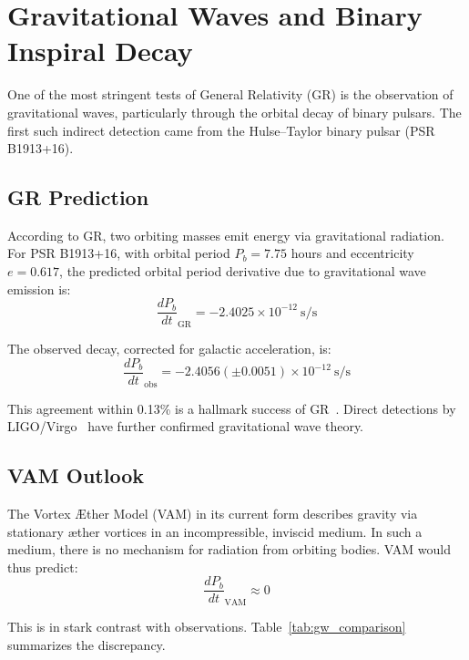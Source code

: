 \section{Gravitational Waves and Binary Inspiral Decay}

One of the most stringent tests of General Relativity (GR) is the observation of gravitational waves, particularly through the orbital decay of binary pulsars. The first such indirect detection came from the Hulse--Taylor binary pulsar (PSR B1913+16).

\subsection*{GR Prediction}

According to GR, two orbiting masses emit energy via gravitational radiation. For PSR B1913+16, with orbital period $P_b = 7.75$ hours and eccentricity $e = 0.617$, the predicted orbital period derivative due to gravitational wave emission is:
\begin{equation}
    \frac{dP_b}{dt}_\text{GR} = -2.4025\times10^{-12} \ \text{s/s}
\end{equation}

The observed decay, corrected for galactic acceleration, is:
\begin{equation}
    \frac{dP_b}{dt}_\text{obs} = -2.4056(\pm 0.0051)\times10^{-12} \ \text{s/s}
\end{equation}

This agreement within 0.13\% is a hallmark success of GR~\cite{weisberg2016}. Direct detections by LIGO/Virgo~\cite{abbott2016} have further confirmed gravitational wave theory.

\subsection*{VAM Outlook}

The Vortex Æther Model (VAM) in its current form describes gravity via stationary æther vortices in an incompressible, inviscid medium. In such a medium, there is no mechanism for radiation from orbiting bodies. VAM would thus predict:
\begin{equation}
    \frac{dP_b}{dt}_\text{VAM} \approx 0
\end{equation}

This is in stark contrast with observations. Table~\ref{tab:gw_comparison} summarizes the discrepancy.

